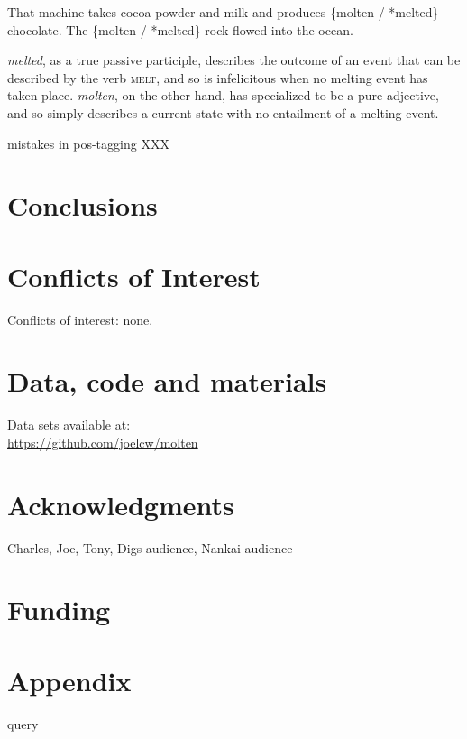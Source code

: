 \documentclass{artikel3}
\begin{document}
\begin{exe}
	\ex \label{statechange1} That machine takes cocoa powder and milk and produces \{molten / *melted\} chocolate.
	\ex \label{statechange2} The \{molten / *melted\} rock flowed into the ocean.
\end{exe}

\noindent \textsl{melted}, as a true passive participle, describes the outcome of an event that can be described by the verb \textsc{melt}, and so is infelicitous when no melting event has taken place. \textsl{molten}, on the other hand, has specialized to be a pure adjective, and so simply describes a current state with no entailment of a melting event.


mistakes in pos-tagging XXX

\section{Conclusions}




\section*{Conflicts of Interest}

Conflicts of interest: none.

\section*{Data, code and materials}

Data sets available at: \\
\url{https://github.com/joelcw/molten}\\


\section*{Acknowledgments}

Charles, Joe, Tony, Digs audience, Nankai audience


\section*{Funding}

\section*{Appendix}
query


\end{document}
